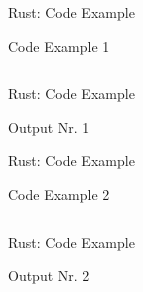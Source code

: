 \appendix
\backupbegin

\begin{frame}[c]{Rust: Code Example}
    \begin{codeboxed}{Code Example 1}
    \inputminted[linenos, fontsize=\normalsize]{Rust}{code/code_ownership.rs}
    \end{codeboxed}
\end{frame}

\begin{frame}[c]{Rust: Code Example}
    \begin{codeboxed}{Output Nr. 1}
        \footnotesize
        
    \end{codeboxed}
\end{frame}

\begin{frame}[c]{Rust: Code Example}
    \begin{codeboxed}{Code Example 2}
    \inputminted[linenos, fontsize=\normalsize]{Rust}{code/code_ownership2.rs}
    \end{codeboxed}
\end{frame}

\begin{frame}[c]{Rust: Code Example}
    \begin{codeboxed}{Output Nr. 2}
        \footnotesize
        
    \end{codeboxed}
\end{frame}

\backupend
